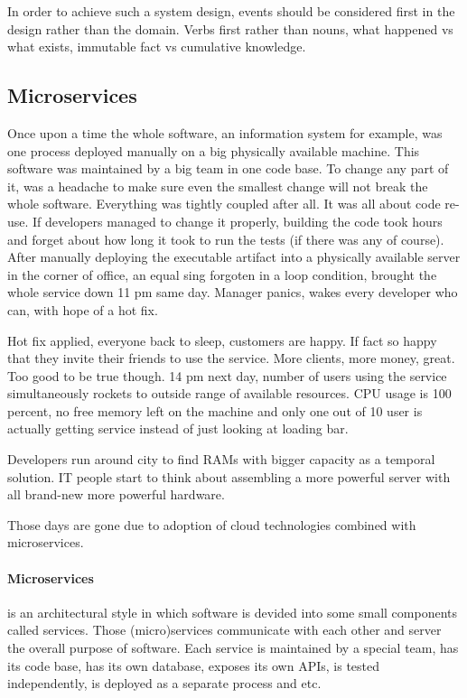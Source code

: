 \documentclass[a4]{report}
\begin{document}
    In order to achieve such a system design, events should be considered first in the design rather than the domain.
    Verbs first rather than nouns, what happened vs what exists, immutable fact vs cumulative knowledge.

    \subsection{Microservices \cite{microservice-architecture} \cite{microservices-pitfalls} \cite{microservices}}
    Once upon a time the whole software, an information system for example, was one process deployed manually on a big
    physically available machine.
    This software was maintained by a big team in one code base.
    To change any part of it, was a headache to make sure even the smallest change will not break the whole software.
    Everything was tightly coupled after all.
    It was all about code re-use.
    If developers managed to change it properly, building the code took hours and forget about how long it took to
    run the tests (if there was any of course).
    After manually deploying the executable artifact into a physically available server in the corner of office, an
    equal sing forgoten in a loop condition, brought the whole service down 11 pm same day.
    Manager panics, wakes every developer who can, with hope of a hot fix.

    Hot fix applied, everyone back to sleep, customers are happy.
    If fact so happy that they invite their friends to use the service.
    More clients, more money, great.
    Too good to be true though.
    14 pm next day, number of users using the service simultaneously rockets to outside range of available resources.
    CPU usage is 100 percent, no free memory left on the machine and only one out of 10 user is actually getting
    service instead of just looking at loading bar.

    Developers run around city to find RAMs with bigger capacity as a temporal solution.
    IT people start to think about assembling a more powerful server with all brand-new more powerful hardware.

    Those days are gone due to adoption of cloud technologies combined with microservices.

    \paragraph{Microservices} is an architectural style in which software is devided into some small components
    called services.
    Those (micro)services communicate with each other and server the overall purpose of software.
    Each service is maintained by a special team, has its code base, has its own database, exposes its own APIs, is
    tested independently, is deployed as a separate process and etc.
\end{document}
